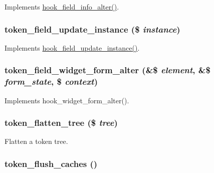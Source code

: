 \label{token_8module_af9c21176f345bfcac32fc7628f06bc1a}
Implements \hyperlink{group__field__types_ga62d5e308d07e62b096d13714ae42335f}{hook\_\-field\_\-info\_\-alter()}. \hypertarget{token_8module_a444dc40d459c42573e310276c66b1389}{
\subsubsection[{token\_\-field\_\-update\_\-instance}]{\setlength{\rightskip}{0pt plus 5cm}token\_\-field\_\-update\_\-instance (\$ {\em instance})}}
\label{token_8module_a444dc40d459c42573e310276c66b1389}
Implements \hyperlink{group__field__crud_gadac9cbd13f55714dbf8fc2a98227f6e3}{hook\_\-field\_\-update\_\-instance()}. \hypertarget{token_8module_a5f0558b9a02d03e37b242199ab380174}{
\subsubsection[{token\_\-field\_\-widget\_\-form\_\-alter}]{\setlength{\rightskip}{0pt plus 5cm}token\_\-field\_\-widget\_\-form\_\-alter (\&\$ {\em element}, \/  \&\$ {\em form\_\-state}, \/  \$ {\em context})}}
\label{token_8module_a5f0558b9a02d03e37b242199ab380174}
Implements hook\_\-widget\_\-form\_\-alter(). \hypertarget{token_8module_a26a3276436562b162a658b74d58acd7f}{
\subsubsection[{token\_\-flatten\_\-tree}]{\setlength{\rightskip}{0pt plus 5cm}token\_\-flatten\_\-tree (\$ {\em tree})}}
\label{token_8module_a26a3276436562b162a658b74d58acd7f}
Flatten a token tree. \hypertarget{token_8module_ae34f0dc7cf6af04b24b316b824b2fe27}{
\subsubsection[{token\_\-flush\_\-caches}]{\setlength{\rightskip}{0pt plus 5cm}token\_\-flush\_\-caches ()}}
